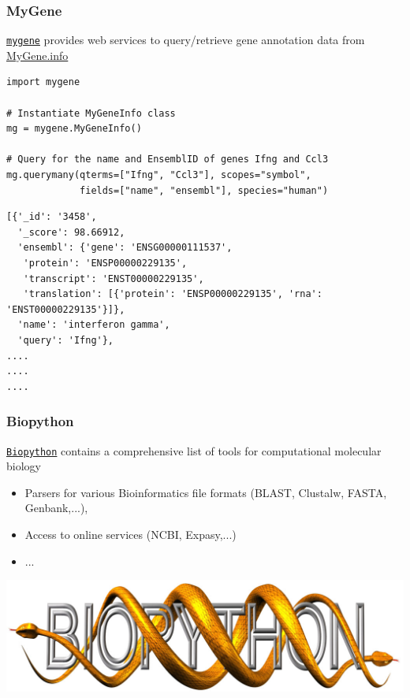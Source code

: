 \documentclass[pdf]{beamer}
\begin{document}
\begin{frame}[fragile]
\frametitle{MyGene}

\href{http://docs.mygene.info/projects/mygene-py/en/latest/}{\texttt{mygene}} provides 
web services to query/retrieve gene annotation data from \href{http://mygene.info/}{MyGene.info}

\vspace{0.2cm}

\begin{lstlisting}[style=python]
import mygene

# Instantiate MyGeneInfo class
mg = mygene.MyGeneInfo() 

# Query for the name and EnsemblID of genes Ifng and Ccl3
mg.querymany(qterms=["Ifng", "Ccl3"], scopes="symbol", 
             fields=["name", "ensembl"], species="human") 
\end{lstlisting}

\vspace{-0.8cm}
{\fontsize{8}{8}\selectfont
\begin{verbatim}
[{'_id': '3458',
  '_score': 98.66912,
  'ensembl': {'gene': 'ENSG00000111537',
   'protein': 'ENSP00000229135',
   'transcript': 'ENST00000229135',
   'translation': [{'protein': 'ENSP00000229135', 'rna': 'ENST00000229135'}]},
  'name': 'interferon gamma',
  'query': 'Ifng'},
....
....
....
\end{verbatim}}

\end{frame}

\begin{frame}[fragile]
\frametitle{Biopython}

\href{http://biopython.org/wiki/Biopython}{\texttt{Biopython}} contains
a comprehensive list of tools for computational molecular biology

\begin{itemize} 
\item Parsers for various Bioinformatics file formats (BLAST, Clustalw, FASTA, Genbank,...), 
\item Access to online services (NCBI, Expasy,...) 
\item ...
\end{itemize}

\vfill

\centering
\includegraphics[width=.7\textwidth]{biopython.jpg}

\end{frame}
\end{document}
